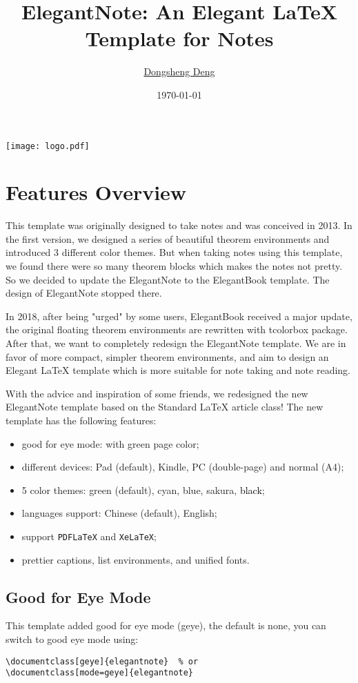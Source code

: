 \documentclass[en,geye,green,screen,14pt]{elegantnote}
\title{ElegantNote: An Elegant \LaTeX{} Template for Notes}
\author{\href{https://ddswhu.me/}{Dongsheng Deng}}
\institute{\href{https://elegantlatex.org/}{Elegant\LaTeX{} Program}}
\date{\today}
\begin{document}
\maketitle
\centerline{\texttt{[image: logo.pdf]}}

\section{Features Overview}
This template was originally designed to take notes and was conceived in 2013. In the first version, we designed a  series of beautiful theorem environments and introduced 3 different color themes. But when taking notes using this template, we found there were so many theorem blocks which makes the notes not pretty. So we decided to update the ElegantNote to the ElegantBook template. The design of ElegantNote stopped there.

In 2018, after being "urged" by some users, ElegantBook received a major update, the original floating theorem environments are rewritten with tcolorbox package. After that, we want to completely redesign the ElegantNote template. We are in favor of more compact, simpler theorem environments, and aim to design an Elegant \LaTeX{} template which is more suitable for note taking and note reading.

With the advice and inspiration of some friends, we redesigned the new ElegantNote template based on the Standard \LaTeX{} article class! The new template has the following features:

\begin{itemize}
\item good for eye mode: with green page color;
\item different devices: Pad (default), Kindle, PC (double-page) and normal (A4);
\item 5 color themes: \textcolor{egreen}{green} (default), \textcolor{ecyan}{cyan}, \textcolor{eblue}{blue}, \textcolor{sakura}{sakura}, \textcolor{black}{black};
\item languages support: Chinese (default), English;
\item support \lstinline{PDFLaTeX} and \lstinline{XeLaTeX};
\item prettier captions, list environments, and unified fonts.
\end{itemize}

\subsection{Good for Eye Mode}
This template added good for eye mode (geye), the default is none, you can switch to good eye mode using:
\begin{lstlisting}[frame=none]  
\documentclass[geye]{elegantnote}  % or
\documentclass[mode=geye]{elegantnote}
\end{lstlisting}
\end{document}
